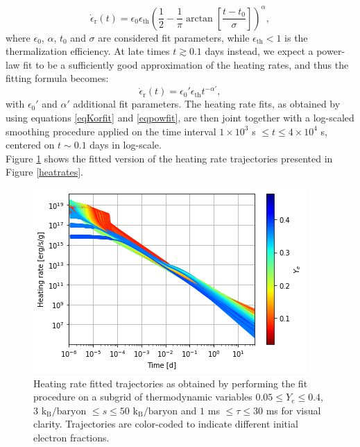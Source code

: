 \documentclass[fleqn,usenatbib]{mnras}
\begin{document}
\begin{itemize}
    \begin{equation}
    \label{eqKorfit}
    \dot{\epsilon}_{\mathrm{r}}(t)=\epsilon_0\epsilon_{\mathrm{th}}\left(\frac{1}{2}-\frac{1}{\pi}\arctan{\left[\frac{t-t_0}{\sigma}\right]}\right)^{\alpha},
    \end{equation}
    where $\epsilon_0$, $\alpha$, $t_0$ and $\sigma$ are considered fit parameters, while $\epsilon_{\mathrm{th}}<1$ is the thermalization efficiency. At late times $t\gtrsim0.1$ days instead, we expect a power-law fit to be a sufficiently good approximation of the heating rates, and thus the fitting formula becomes:
    \begin{equation}
    \label{eqpowfit}
    \dot{\epsilon}_{\mathrm{r}}(t)=\epsilon_0'\epsilon_{\mathrm{th}}t^{-\alpha'},
    \end{equation}
    with $\epsilon_0'$ and $\alpha'$ additional fit parameters. The heating rate fits, as obtained by using equations \ref{eqKorfit} and \ref{eqpowfit}, are then joint together with a log-scaled smoothing procedure applied on the time interval $1\times10^3$ s $\leq t\leq4\times10^4$ s, centered on $t\sim0.1$ days in log-scale.\\
    Figure \ref{heatratesfit} shows the fitted version of the heating rate trajectories presented in Figure \ref{heatrates}.
    \begin{figure}
    \centering
    \includegraphics[scale=0.65]{figures/heating/heating rate fits/heatratesfit.png}
    \caption{Heating rate fitted trajectories as obtained by performing the fit procedure on a subgrid of thermodynamic variables $0.05\leq Y_e\leq0.4$, $3$ $\mathrm{k_B/baryon}$ $\leq s\leq50$ $\mathrm{k_B/baryon}$ and $1$ ms $\leq\tau\leq30$ ms for visual clarity. Trajectories are color-coded to indicate different initial electron fractions.}
    \label{heatratesfit}
    \end{figure}

\end{itemize}
\end{document}
